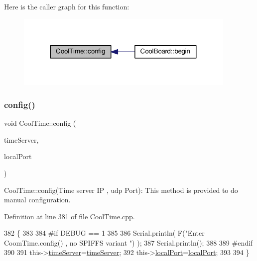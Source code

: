 Here is the caller graph for this function\+:\nopagebreak
\begin{figure}[H]
\begin{center}
\leavevmode
\includegraphics[width=299pt]{d6/d49/class_cool_time_a87c28260c1bc77091162cbcf1ee2e129_icgraph}
\end{center}
\end{figure}
\mbox{\label{class_cool_time_a014656d0d3f74d6391364b92b13e0780}} 
\subsubsection{\texorpdfstring{config()}{config()}\hspace{0.1cm}{\footnotesize\ttfamily [2/2]}}
{\footnotesize\ttfamily void Cool\+Time\+::config (\begin{DoxyParamCaption}\item[{I\+P\+Address}]{time\+Server,  }\item[{unsigned int}]{local\+Port }\end{DoxyParamCaption})}

Cool\+Time\+::config(\+Time server I\+P , udp Port)\+: This method is provided to do manual configuration. 

Definition at line 381 of file Cool\+Time.\+cpp.


\begin{DoxyCode}
382 \{
383 
384 \textcolor{preprocessor}{#if DEBUG == 1 }
385 
386     Serial.println( F(\textcolor{stringliteral}{"Enter CoomTime.config() , no SPIFFS variant "}) );
387     Serial.println();
388 
389 \textcolor{preprocessor}{#endif }
390 
391     this->\hyperlink{class_cool_time_ad2b9858f399108cb440dd1e908916f04}{timeServer}=\hyperlink{class_cool_time_ad2b9858f399108cb440dd1e908916f04}{timeServer};
392     this->\hyperlink{class_cool_time_a2f777da44d7ba678be8185299e9b49d1}{localPort}=\hyperlink{class_cool_time_a2f777da44d7ba678be8185299e9b49d1}{localPort};
393     
394 \} 
\end{DoxyCode}
\mbox{\label{class_cool_time_acd537cd4210d7bde4e1f5c47d2ac0456}} 
